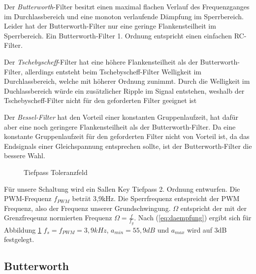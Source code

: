 Der \emph{Butterworth}-Filter besitzt einen maximal flachen Verlauf des Frequenzganges im Durchlassbereich und eine monoton verlaufende Dämpfung im Sperrbereich.
Leider hat der Butterworth-Filter nur eine geringe Flankensteilheit im Sperrbereich. Ein Butterworth-Filter 1. Ordnung entspricht einen  einfachen RC-Filter.

Der \emph{Tschebyscheff}-Filter hat eine höhere Flankensteilheit als der Butterworth-Filter, allerdings entsteht beim Tschebyscheff-Filter Welligkeit im Durchlassbereich,
welche mit höherer Ordnung zunimmt. Durch die Welligkeit im Duchlassbereich würde ein zusätzlicher Ripple im Signal entstehen, weshalb der Tschebyscheff-Filter nicht
für den geforderten Filter geeignet ist 

Der \emph{Bessel-Filter} hat den Vorteil einer konstanten Gruppenlaufzeit, hat dafür aber eine noch geringere Flankensteilheit als der Butterworth-Filter.
Da eine konstante Gruppenlaufzeit für den geforderten Filter nicht von Vorteil ist, da das Endsignals einer Gleichspannung entsprechen sollte, ist der Butterworth-Filter
die bessere Wahl.


\begin{figure}[H]
\centering
{}
\caption{Tiefpass Toleranzfeld}%
\label{fig:analog}
\end{figure}
Für unsere Schaltung wird ein Sallen Key Tiefpass 2. Ordnung entwurfen. Die PWM-Frequenz $f_{PWM}$ beträt 3,9kHz.
Die Sperrfrequenz entspreicht der PWM Frequenz, also der Frequenz unserer Grundschwingung. $\Omega$ entspricht der mit der Grenzfreqeunz 
normierten Frequenz $\Omega=\frac{f}{f_g}$. Nach (\ref{eq:daempfung}) ergibt sich für Abbildung \ref{fig:analog}
$f_s=f_{PWM}=3,9 kHz$, $a_{min}=55,9 dB$ und $a_{max}$ wird auf 3dB festgelegt.



\subsection{Butterworth}
